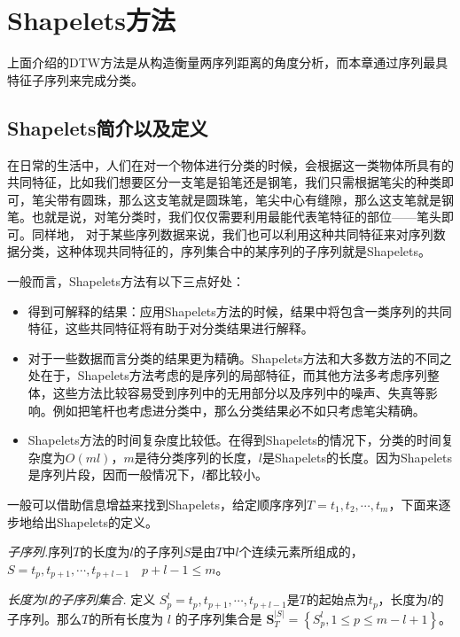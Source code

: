\chapter{Shapelets方法}
上面介绍的DTW方法是从构造衡量两序列距离的角度分析，而本章通过序列最具特征子序列来完成分类。
\section{Shapelets简介以及定义}
在日常的生活中，人们在对一个物体进行分类的时候，会根据这一类物体所具有的共同特征，比如我们想要区分一支笔是铅笔还是钢笔，我们只需根据笔尖的种类即可，笔尖带有圆珠，那么这支笔就是圆珠笔，笔尖中心有缝隙，那么这支笔就是钢笔。也就是说，对笔分类时，我们仅仅需要利用最能代表笔特征的部位——笔头即可。同样地，  对于某些序列数据来说，我们也可以利用这种共同特征来对序列数据分类，这种体现共同特征的，序列集合中的某序列的子序列就是Shapelets\cite{Ye2009}。

一般而言，Shapelets方法有以下三点好处：
\begin{itemize}
  \item 得到可解释的结果：应用Shapelets方法的时候，结果中将包含一类序列的共同特征，这些共同特征将有助于对分类结果进行解释。
  \item 对于一些数据而言分类的结果更为精确。Shapelets方法和大多数方法的不同之处在于，Shapelets方法考虑的是序列的局部特征，而其他方法多考虑序列整体，这些方法比较容易受到序列中的无用部分以及序列中的噪声、失真等影响。例如把笔杆也考虑进分类中，那么分类结果必不如只考虑笔尖精确。
  \item Shapelets方法的时间复杂度比较低。在得到Shapelets的情况下，分类的时间复杂度为$O(ml)$，$m$是待分类序列的长度，$l$是Shapelets的长度。因为Shapelets是序列片段，因而一般情况下，$l$都比较小。
\end{itemize}

一般可以借助信息增益来找到Shapelets，给定顺序序列$T = t_1,t_2,\cdots ,t_m$，下面来逐步地给出Shapelets的定义。

\begin{mydef}
\emph{子序列.}序列$T$的长度为$l$的子序列$S$是由$T$中$l$个连续元素所组成的，$S = t_p,t_{p+1},\cdots,t_{p+l-1} \quad p+l-1 \leq m$。
\end{mydef}

\begin{mydef}
\emph{长度为$l$的子序列集合.} 定义 $S_p^l = {t_p},{t_{p + 1}}, \cdots ,{t_{p + l - 1}}$是$T$的起始点为$t_p$，长度为$l$的子序列。那么$T$的所有长度为 $l$ 的子序列集合是 $\bm{S}_T^{\left| S \right|} = \left\{ {S_p^l,1 \le p \le m - l + 1} \right\}$。
\end{mydef}

